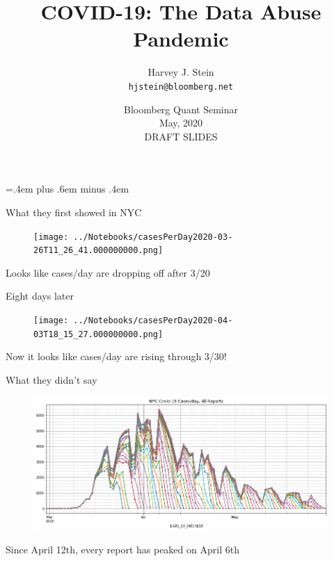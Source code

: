 \documentclass[aspectratio=169]{beamer}
\title{COVID-19: The Data Abuse Pandemic}
\author[Harvey J. Stein]{Harvey J. Stein\\\texttt{hjstein@bloomberg.net}}
\institute[Bloomberg LP]
{
  Head, Quantitative Risk Analytics\\
  Bloomberg L.P.
}
\date{Bloomberg Quant Seminar\\
  May, 2020\\
  DRAFT SLIDES}
\begin{document}
\nocite{nyc2020data,Stein2020nycdata,Stein2020owiddata,owid2020data}
\nocite{Stein2020Seem,Stein2020Ray,owid2020data,JHU2020data}
\nocite{NYT2020data}

\parskip=.4em plus .6em minus .4em

\begin{frame}

  \titlepage


\end{frame}

\begin{frame}{What they first showed in NYC}
  \begin{figure}
    \centering
    \texttt{[image: ../Notebooks/casesPerDay2020-03-26T11\_26\_41.000000000.png]}
  \end{figure}
  Looks like cases/day are dropping off after 3/20
\end{frame}

\begin{frame}{Eight days later}
  \begin{figure}
    \centering
    \texttt{[image: ../Notebooks/casesPerDay2020-04-03T18\_15\_27.000000000.png]}
  \end{figure}
  Now it looks like cases/day are \alert{rising} through 3/30!
\end{frame}

\begin{frame}{What they didn't say}
  \begin{figure}
    \centering
    \includegraphics[width=.9\textwidth]{../Notebooks/theFullStory.png}
  \end{figure}
  Since April 12th, every report has peaked on April 6th
\end{frame}
\end{document}
